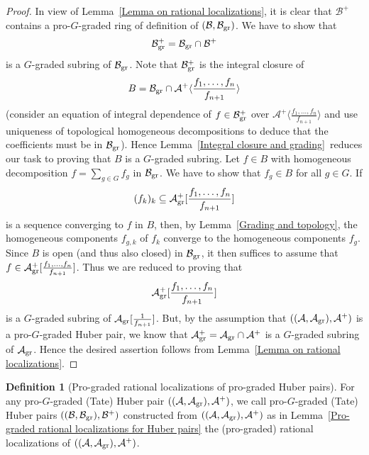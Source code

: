 \documentclass[12pt,twoside,a4paper]{article}
\theoremstyle{definition}
\newtheorem{mydef}[thm]{Definition}
\theoremstyle{remark}
\newcommand\gr{{\rm gr}}
\begin{document}
\begin{proof}In view of Lemma~\ref{Lemma on rational localizations}, it is clear that $\mathcal{B}^{+}$ contains a pro-$G$-graded ring of definition of $(\mathcal{B}, \mathcal{B}_{\gr})$. We have to show that
\begin{equation*}\mathcal{B}_{\gr}^{+}=\mathcal{B}_{\gr}\cap \mathcal{B}^{+}\end{equation*}is a $G$-graded subring of $\mathcal{B}_{\gr}$. Note that $\mathcal{B}_{\gr}^{+}$ is the integral closure of \begin{equation*}B=\mathcal{B}_{\gr}\cap \mathcal{A}^{+}\langle\frac{f_1,\dots, f_{n}}{f_{n+1}}\rangle\end{equation*}(consider an equation of integral dependence of $f\in \mathcal{B}_{\gr}^{+}$ over $\mathcal{A}^{+}\langle\frac{f_1,\dots, f_{n}}{f_{n+1}}\rangle$ and use uniqueness of topological homogeneous decompositions to deduce that the coefficients must be in $\mathcal{B}_{\gr}$).  Hence Lemma~\ref{Integral closure and grading} reduces our task to proving that $B$ is a $G$-graded subring. Let $f\in B$ with homogeneous decomposition $f=\sum_{g\in G}f_{g}$ in $\mathcal{B}_{\gr}$. We have to show that $f_{g}\in B$ for all $g\in G$. If \begin{equation*}(f_{k})_{k}\subseteq \mathcal{A}_{\gr}^{+}[\frac{f_1,\dots, f_n}{f_{n+1}}]\end{equation*}is a sequence converging to $f$ in $B$, then, by Lemma~\ref{Grading and topology}, the homogeneous components $f_{g, k}$ of $f_{k}$ converge to the homogeneous components $f_{g}$. Since $B$ is open (and thus also closed) in $\mathcal{B}_{\gr}$, it then suffices to assume that $f\in \mathcal{A}_{\gr}^{+}[\frac{f_1,\dots, f_n}{f_{n+1}}]$. Thus we are reduced to proving that \begin{equation*}\mathcal{A}_{\gr}^{+}[\frac{f_1,\dots, f_n}{f_{n+1}}]\end{equation*}is a $G$-graded subring of $\mathcal{A}_{\gr}[\frac{1}{f_{n+1}}]$. But, by the assumption that $((\mathcal{A}, \mathcal{A}_{\gr}), \mathcal{A}^{+})$ is a pro-$G$-graded Huber pair, we know that $\mathcal{A}_{\gr}^{+}=\mathcal{A}_{\gr}\cap \mathcal{A}^{+}$ is a $G$-graded subring of $\mathcal{A}_{\gr}$. Hence the desired assertion follows from Lemma~\ref{Lemma on rational localizations}.\end{proof}
\begin{mydef}[Pro-graded rational localizations of pro-graded Huber pairs]For any pro-$G$-graded (Tate) Huber pair $((\mathcal{A}, \mathcal{A}_{\gr}), \mathcal{A}^{+})$, we call pro-$G$-graded (Tate) Huber pairs $((\mathcal{B}, \mathcal{B}_{\gr}), \mathcal{B}^{+})$ constructed from $((\mathcal{A}, \mathcal{A}_{\gr}), \mathcal{A}^{+})$ as in Lemma~\ref{Pro-graded rational localizations for Huber pairs} the (pro-graded) rational localizations of $((\mathcal{A}, \mathcal{A}_{\gr}), \mathcal{A}^{+})$.\end{mydef}
\end{document}
